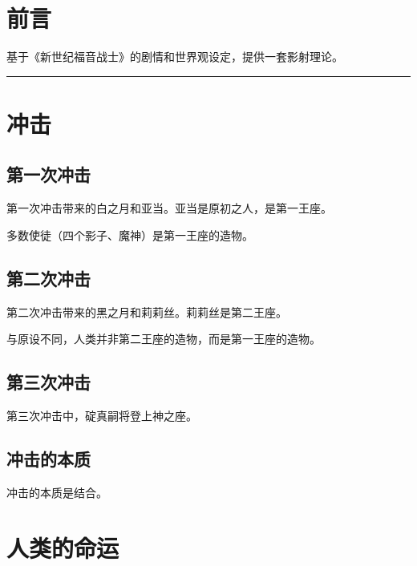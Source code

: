 
\uselangzh



\setlength{\tabulinesep}{5pt}




\section*{前言}

基于《新世纪福音战士》的剧情和世界观设定，提供一套影射理论。


\vspace{20pt}
\hrule
\vspace{10pt}

\section{冲击}
\subsection{第一次冲击}

第一次冲击带来的白之月和亚当。亚当是原初之人，是第一王座。

多数使徒（四个影子、魔神）是第一王座的造物。

\subsection{第二次冲击}

第二次冲击带来的黑之月和莉莉丝。莉莉丝是第二王座。

与原设不同，人类并非第二王座的造物，而是第一王座的造物。

\subsection{第三次冲击}

第三次冲击中，碇真嗣将登上神之座。

\subsection{冲击的本质}

冲击的本质是结合。

\section{人类的命运}






